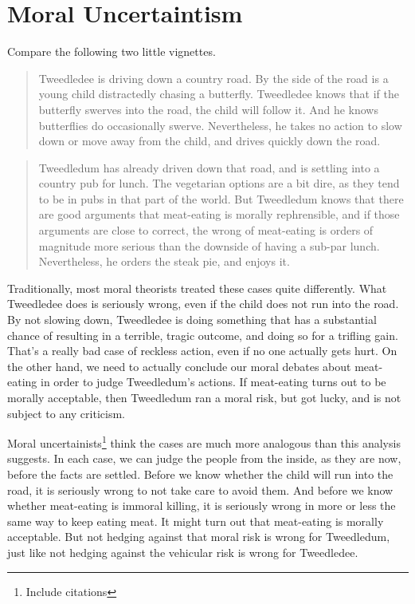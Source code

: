 \section{Moral Uncertaintism}
\label{moraluncertaintism}

Compare the following two little vignettes.

\begin{quote}
Tweedledee is driving down a country road. By the side of the road is a young child distractedly chasing a butterfly. Tweedledee knows that if the butterfly swerves into the road, the child will follow it. And he knows butterflies do occasionally swerve. Nevertheless, he takes no action to slow down or move away from the child, and drives quickly down the road.
\end{quote}

\begin{quote}
Tweedledum has already driven down that road, and is settling into a country pub for lunch. The vegetarian options are a bit dire, as they tend to be in pubs in that part of the world. But Tweedledum knows that there are good arguments that meat-eating is morally rephrensible, and if those arguments are close to correct, the wrong of meat-eating is orders of magnitude more serious than the downside of having a sub-par lunch. Nevertheless, he orders the steak pie, and enjoys it.
\end{quote}

Traditionally, most moral theorists treated these cases quite differently. What Tweedledee does is seriously wrong, even if the child does not run into the road. By not slowing down, Tweedledee is doing something that has a substantial chance of resulting in a terrible, tragic outcome, and doing so for a trifling gain. That's a really bad case of reckless action, even if no one actually gets hurt. On the other hand, we need to actually conclude our moral debates about meat-eating in order to judge Tweedledum's actions. If meat-eating turns out to be morally acceptable, then Tweedledum ran a moral risk, but got lucky, and is not subject to any criticism.

Moral uncertainists\footnote{Include citations} think the cases are much more analogous than this analysis suggests. In each case, we can judge the people from the inside, as they are now, before the facts are settled. Before we know whether the child will run into the road, it is seriously wrong to not take care to avoid them. And before we know whether meat-eating is immoral killing, it is seriously wrong in more or less the same way to keep eating meat. It might turn out that meat-eating is morally acceptable. But not hedging against that moral risk is wrong for Tweedledum, just like not hedging against the vehicular risk is wrong for Tweedledee.

